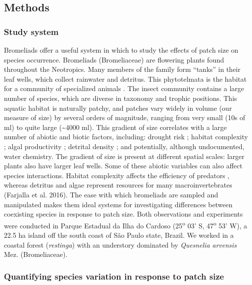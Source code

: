 \subsection{Methods}\label{methods}

\subsubsection{Study system}\label{study-system}

Bromeliads offer a useful system in which to study the effects of
patch size on species occurrence. Bromeliads (Bromeliaceae) are
flowering plants found throughout the Neotropics. Many members of the
family form ``tanks'' in their leaf wells, which collect rainwater and
detritus. This phytotelmata is the habitat for a community of
specialized animals \citep{Frank2009, Benzing2000}. The insect community
contains a large number of species, which are diverse in taxonomy and
trophic positions. This aquatic habitat is naturally patchy, and patches
vary widely in volume (our measure of size) by several orders of
magnitude, ranging from very small (10s of ml) to quite large
(\textasciitilde{}4000 ml). This gradient of size correlates with a
large number of abiotic and biotic factors, including: drought risk
\citep{Amundrud2015}; habitat complexity \citep{Srivastava2006a}; algal
productivity \citep{Marino2011}; detrital density
\citep{Richardson1999}; and potentially, although undocumented, water
chemistry. The gradient of size is present at different spatial scales:
larger plants also have larger leaf wells. Some of these abiotic
variables can also affect species interactions. Habitat complexity
affects the efficiency of predators \citep{Srivastava2006a}, whereas
detritus and algae represent resources for many macroinvertebrates
(Farjalla et al. 2016). The ease with which bromeliads are sampled and
manipulated makes them ideal systems for investigating differences
between coexisting species in response to patch size. Both
observations and experiments were conducted in Parque Estadual da Ilha
do Cardoso (25\textsuperscript{o} 03' S, 47\textsuperscript{o} 53' W), a
22.5 ha island off the south coast of São Paulo state, Brazil. We worked
in a coastal forest (\emph{restinga}) with an understory dominated by
\emph{Quesnelia arvensis} Mez. (Bromeliaceae).

\subsubsection{Quantifying species variation in response to patch
size}\label{quantifying-species-variation-in-response-to-patch-size}

